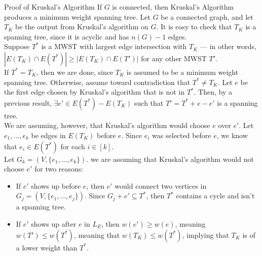 \documentclass[10pt]{extarticle}
\begin{document}
  \begin{problem}{Proof of Kruskal's Algorithm}
    If $G$ is connected, then Kruskal's Algorithm produces a minimum weight spanning tree.
    \tcblower
    Let $G$ be a connected graph, and let $T_K$ be the output from Kruskal's algorithm on $G$. It is easy to check that $T_K$ is a spanning tree, since it is acyclic and has $n(G) - 1$ edges.\\

    Suppose $T^*$ is a MWST with largest edge intersection with $T_K$ --- in other words, $|E(T_K)\cap E(T^*)| \geq |E(T_K)\cap E(T')|$ for any other MWST $T'$.\\

    If $T^* = T_K$, then we are done, since $T_K$ is assumed to be a minimum weight spanning tree. Otherwise, assume toward contradiction that $T^*\neq T_K$. Let $e$ be the first edge chosen by Kruskal's algorithm that is not in $T^*$. Then, by a previous result, $\exists e'\in E(T^*) - E(T_K)$ such that $T' = T^* +e-e'$ is a spanning tree.\\

    We are assuming, however, that Kruskal's algorithm would choose $e$ over $e'$. Let $e_1,\dots,e_k$ be edges in $E(T_K)$ before $e$. Since $e_i$ was selected before $e$, we know that $e_i\in E(T^*)$ for each $i\in [k]$.\\

    Let $G_k = (V,\{e_1,\dots,e_k\})$. we are assuming that Kruskal's algorithm would not choose $e'$ for two reasons:
    \begin{itemize}
      \item If $e'$ shows up before $e$, then $e'$ would connect two vertices in $G_j = (V,\{e_1,\dots,e_j\})$. Since $G_j + e'\subseteq T^*$, then $T^*$ contains a cycle and isn't a spanning tree.
      \item If $e'$ shows up after $e$ in $L_E$, then $w(e') \geq w(e)$, meaning $w(T') \leq w(T^*)$, meaning that $w(T_K) \leq w(T^*)$, implying that $T_K$ is of a lower weight than $T^*$. 
    \end{itemize}
  \end{problem}
\end{document}
